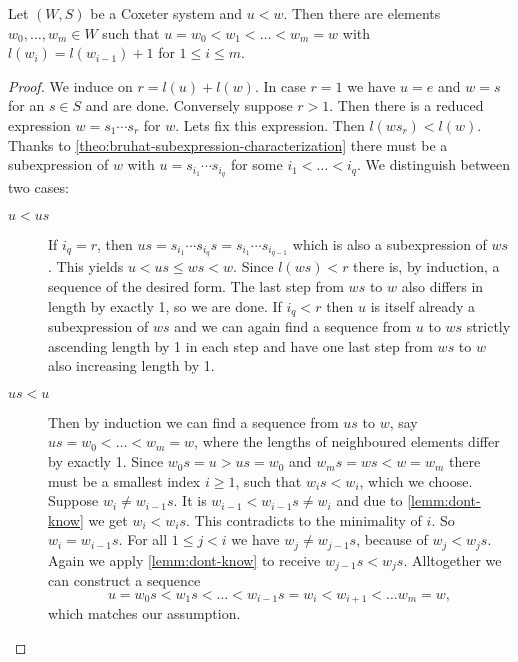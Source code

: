 \begin{prop}
	Let $(W,S)$ be a Coxeter system and $u < w$. Then there are elements $w_0,\ldots,w_m \in W$ such that $u = w_0 < w_1 < \ldots < w_m = w$ with $l(w_i) = l(w_{i-1}) + 1$ for $1 \leq i \leq m$.

	\begin{proof}
		We induce on $r = l(u) + l(w)$. In case $r = 1$ we have $u = e$ and $w = s$ for an $s \in S$ and are done. Conversely suppose $r > 1$. Then there is a reduced expression $w = s_1 \cdots s_r$ for $w$. Lets fix this expression. Then $l(w s_r) < l(w)$. Thanks to \ref{theo:bruhat-subexpression-characterization} there must be a subexpression of $w$ with $u = s_{i_1} \cdots s_{i_q}$ for some $i_1 < \ldots < i_q$. We distinguish between two cases:

		\begin{description}
			\item[$u < us$] If $i_q = r$, then $us = s_{i_1} \cdots s_{i_q} s = s_{i_1} \cdots s_{i_{q-1}}$ which is also a subexpression of $ws$. This yields $u < us \leq ws < w$. Since $l(ws) < r$ there is, by induction, a sequence of the desired form. The last step from $ws$ to $w$ also differs in length by exactly 1, so we are done. If $i_q < r$ then $u$ is itself already a subexpression of $ws$ and we can again find a sequence from $u$ to $ws$ strictly ascending length by 1 in each step and have one last step from $ws$ to $w$ also increasing length by 1.
			\item[$us < u$] Then by induction we can find a sequence from $us$ to $w$, say $us = w_0 < \ldots < w_m = w$, where the lengths of neighboured elements differ by exactly 1. Since $w_0 s = u > us = w_0$ and $w_m s = ws < w = w_m$ there must be a smallest index $i \geq 1$, such that $w_i s < w_i$, which we choose. Suppose $w_i \neq w_{i-1} s$. It is $w_{i-1} < w_{i-1}s \neq w_i$ and due to \ref{lemm:dont-know} we get $w_i < w_i s$. This contradicts to the minimality of $i$. So $w_i = w_{i-1} s$. For all $1 \leq j < i$ we have $w_j \neq w_{j-1} s$, because of $w_j < w_j s$. Again we apply \ref{lemm:dont-know} to receive $w_{j-1} s < w_j s$. Alltogether we can construct a sequence
			$$ u = w_0 s < w_1 s < \ldots < w_{i-1} s = w_i < w_{i+1} < \ldots w_m = w, $$
			which matches our assumption. \qedhere
		\end{description}
	\end{proof}
\end{prop}

